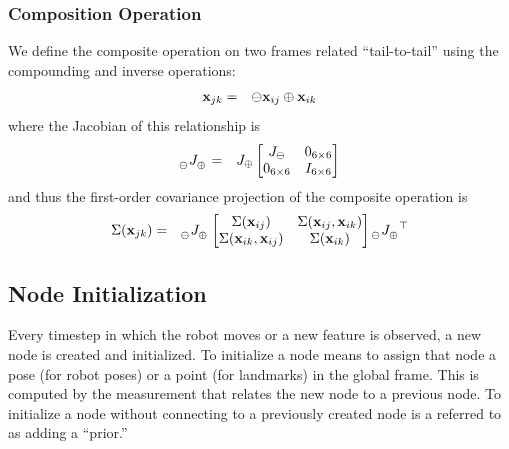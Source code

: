 \documentclass[conference]{IEEEtran}
\begin{document}
\subsubsection{Composition Operation}
\label{sub:compositionoperation}
We define the composite operation on two frames related
``tail-to-tail'' using the compounding and inverse operations:
\begin{eqnarray*}
  {\bf x}_{jk} & = & \ominus {\bf x}_{ij} \oplus {\bf x}_{ik}
\end{eqnarray*}
where the Jacobian of this relationship is 
\begin{eqnarray*}
  \tensor[_\ominus]{J}{_\oplus} & = & J_\oplus \begin{bmatrix}
    J_\ominus & 0_{6 \times 6}\\
    0_{6 \times 6} & I_{6 \times 6}\\
  \end{bmatrix}
\end{eqnarray*}
and thus the first-order covariance projection of the composite
operation is
\begin{eqnarray*}
  \Sigma({\bf x}_{jk}) & = & \tensor[_\ominus]{J}{_\oplus} \begin{bmatrix}
    \Sigma({\bf x}_{ij}) & \Sigma({\bf x}_{ij}, {\bf x}_{ik})\\
    \Sigma({\bf x}_{ik}, {\bf x}_{ij}) & \Sigma({\bf x}_{ik})\\
  \end{bmatrix} \tensor[_\ominus]{J}{_\oplus^\top}
\end{eqnarray*}



\subsection{Node Initialization}
\label{sub:nodeinitializationandedgeresiduals}
Every timestep in which the robot moves or a new feature is observed, a new node is created
and initialized.  To initialize a node means to assign that node a pose (for robot poses)
or a point (for landmarks) in the global frame.  This is computed by the measurement
that relates the new node to a previous node.  To initialize a node without connecting to
a previously created node is a referred to as adding a ``prior.''
\end{document}
